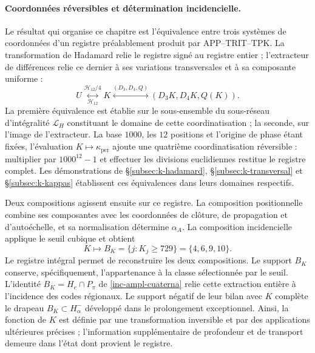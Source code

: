 \paragraph{Coordonnées réversibles et détermination incidencielle.}
\label{ampl-alfa-k-intro-reversible}
Le résultat qui organise ce chapitre est l'équivalence entre trois
systèmes de coordonnées d'un registre préalablement produit par
APP--TRIT--TPK. La transformation de Hadamard relie le registre
signé au registre entier ; l'extracteur de différences relie
ce dernier à ses variations transversales et à sa composante uniforme :
\[
 U\underset{\mathcal H_{12}}{\overset{\mathcal H_{12}/4}{\longleftrightarrow}}K
 \overset{(D_3,D_4,Q)}{\longleftrightarrow}
 (D_3K,D_4K,Q(K)).
\]
La première équivalence est établie sur le sous-ensemble du sous-réseau d'intégralité $\mathcal L_H$ constituant le domaine de cette coordinatisation ; la seconde, sur l'image de l'extracteur. La base $1000$, les $12$ positions et l'origine de phase étant fixées, l'évaluation $K\mapsto\kappa_{\mathrm{per}}$ ajoute une quatrième coordinatisation réversible : multiplier par $1000^{12}-1$ et effectuer les divisions euclidiennes restitue le registre complet. Les démonstrations de \S\ref{subsec:k-hadamard}, \S\ref{subsec:k-transversal} et \S\ref{subsec:k-kappas} établissent ces équivalences dans leurs domaines respectifs.

Deux compositions agissent ensuite sur ce registre. La composition
positionnelle combine ses composantes avec les coordonnées de clôture,
de propagation et d'autoéchelle, et sa normalisation détermine $\alpha_A$. La
composition incidencielle applique le seuil cubique et obtient
\[
 K\longmapsto B_K=\{j:K_j\geq729\}=\{4,6,9,10\}.
\]
Le registre intégral permet de reconstruire les deux compositions. Le support
$B_K$ conserve, spécifiquement, l'appartenance à la classe sélectionnée
par le seuil. L'identité $B_K=H_e\cap P_\pi$ de
\eqref{inc-ampl-cuaterna} relie cette extraction entière à l'incidence
des codes régionaux. Le support négatif de leur bilan avec $K$
complète le drapeau $B_K\subset H^-_\alpha$ développé dans le
prolongement exceptionnel. Ainsi, la fonction de $K$ est définie par
une transformation inversible et par des applications ultérieures
précises ; l'information supplémentaire de profondeur et de transport demeure
dans l'état dont provient le registre.
